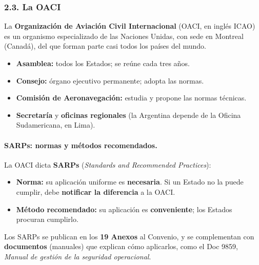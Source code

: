 \subsubsection*{2.3. La OACI}
La \textbf{Organización de Aviación Civil Internacional} (OACI, en inglés ICAO) es un organismo
especializado de las Naciones Unidas, con sede en Montreal (Canadá), del que forman parte casi
todos los países del mundo.
\begin{itemize}
  \item \textbf{Asamblea:} todos los Estados; se reúne cada tres años.
  \item \textbf{Consejo:} órgano ejecutivo permanente; adopta las normas.
  \item \textbf{Comisión de Aeronavegación:} estudia y propone las normas técnicas.
  \item \textbf{Secretaría} y \textbf{oficinas regionales} (la Argentina depende de la Oficina
        Sudamericana, en Lima).
\end{itemize}

\paragraph*{SARPs: normas y métodos recomendados.}
La OACI dicta \textbf{SARPs} (\textit{Standards and Recommended Practices}):
\begin{itemize}
  \item \textbf{Norma:} su aplicación uniforme es \textbf{necesaria}. Si un Estado no la puede
        cumplir, debe \textbf{notificar la diferencia} a la OACI.
  \item \textbf{Método recomendado:} su aplicación es \textbf{conveniente}; los Estados procuran
        cumplirlo.
\end{itemize}
Los SARPs se publican en los \textbf{19 Anexos} al Convenio, y se complementan con
\textbf{documentos} (manuales) que explican cómo aplicarlos, como el Doc 9859, \textit{Manual de
gestión de la seguridad operacional}.

